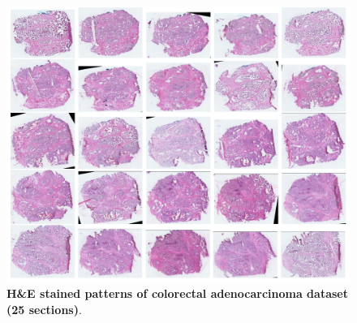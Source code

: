 \documentclass{WileyMSP-template}
\begin{document}
\begin{figure}[htbp]
  \centering
  \includegraphics[width=\textwidth]{pic/all_op.png}
  \captionsetup{justification=raggedright,singlelinecheck=false}
  \caption{\textbf{H\&E stained patterns of colorectal adenocarcinoma dataset (25 sections)}.} 
  \label{fig:op of colorectal adenocarcinoma dataset} 
\end{figure}
 
\end{document}
